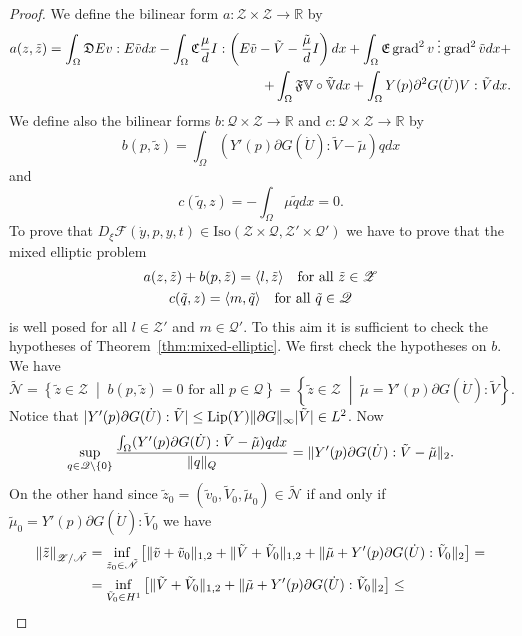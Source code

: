 \begin{proof}
We define the bilinear form $a\colon\mathscr{Z}\times\mathscr{Z}\to\mathbb{R}$ by
\[
\begin{split}
a(z,\tilde z)=\int_\Omega\mathfrak{D}Ev:E\tilde vdx-\int_\Omega\mathfrak{C}\frac{\mu}{d}I:\left(E\tilde v-\tilde V-\frac{\tilde\mu}{d}I\right)dx+\int_\Omega\mathfrak{E}\operatorname{grad}^2 v\mathbin{\vdots}\operatorname{grad}^2\tilde vdx+\\
+\int_\Omega\mathfrak{F}\mathbb{V}\circ\tilde{\mathbb{V}}dx+\int_{\Omega}Y(p)\partial^2G(\dot{U})V:\tilde Vdx.
\end{split}
\]
We define also the bilinear forms $b\colon\mathscr{Q}\times\mathscr{Z}\to\mathbb{R}$ and $c\colon\mathscr{Q}\times\mathscr{Z}\to\mathbb{R}$ by
\[
b(p,\tilde z)=\int_{\Omega}(Y'(p)\partial G(\dot{U}):\tilde V-\tilde\mu)qdx
\]
and
\[
c(\tilde q,z)=-\int_\Omega\mu\tilde qdx=0.
\]
To prove that $D_\xi\mathcal{F}(\dot y,p,y,t)\in\text{Iso}(\mathscr{Z}\times\mathscr{Q},\mathscr{Z}'\times\mathscr{Q}')$ we have to prove that the mixed elliptic problem
\begin{gather*}
a(z,\tilde z)+b(p,\tilde z)=\langle l,\tilde z\rangle\quad\text{for all $\tilde z\in\mathscr{Z}$} \\
c(\tilde q,z)=\langle m,\tilde q\rangle\quad\text{for all $\tilde q\in\mathscr{Q}$}
\end{gather*}
is well posed for all $l\in\mathscr{Z}'$ and $m\in\mathscr{Q}'$. To this aim it is sufficient to check the hypotheses of Theorem~\ref{thm:mixed-elliptic}. We first check the hypotheses on $b$. We have
\[
\tilde{\mathscr{N}}=\left\{\tilde z\in\mathcal Z\;\middle|\;\text{$b(p,\tilde z)=0$ for all $p\in\mathscr{Q}$}\right\}=\left\{\tilde z\in\mathcal Z\;\middle|\;\tilde\mu=Y'(p)\partial G(\dot{U}):\tilde{V}\right\}.
\]
Notice that $|Y'(p)\partial G(\dot{U}):\tilde{V}|\le\text{Lip}(Y)\lVert\partial G\rVert_\infty|\tilde V|\in L^2$. Now
\[
\sup_{q\in\mathscr{Q}\setminus\{0\}}\frac{\int_{\Omega}(Y'(p)\partial G(\dot{U}):\tilde{V}-\tilde\mu)qdx}{\lVert q\rVert_Q}=\lVert Y'(p)\partial G(\dot U):\tilde V-\tilde\mu\rVert_2.
\]
On the other hand since $\tilde z_0=(\tilde v_0,\tilde V_0,\tilde\mu_0)\in\tilde{\mathscr N}$ if and only if $\tilde\mu_0=Y'(p)\partial G(\dot{U}):\tilde{V}_0$ we have
\[
\begin{split}
\norm{\tilde z}_{\mathscr{Z}/\tilde{\mathscr{N}}}&=\inf_{\tilde z_0\in\tilde{\mathscr N}}\left[\norm{\tilde v+\tilde v_0}_{1,2}+\norm{\tilde V+\tilde V_0}_{1,2}+\norm{\tilde\mu+Y'(p)\partial G(\dot{U}):\tilde{V}_0}_2\right]=\\
&=\inf_{\tilde V_0\in H^1}\left[\norm{\tilde V+\tilde V_0}_{1,2}+\norm{\tilde\mu+Y'(p)\partial G(\dot{U}):\tilde{V}_0}_2\right]\le\\

\end{split}\]
\end{proof}

